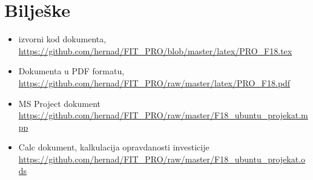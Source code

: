 \documentclass[times, utf8, seminar]{fit}
\begin{document}
\chapter{Bilješke}
\label{chap:biljeske}

\begin{itemize}
  \item izvorni kod dokumenta, \url{https://github.com/hernad/FIT_PRO/blob/master/latex/PRO_F18.tex}
  \item Dokumenta u PDF formatu, \url{https://github.com/hernad/FIT_PRO/raw/master/latex/PRO_F18.pdf}
  \item MS Project dokument \url{https://github.com/hernad/FIT_PRO/raw/master/F18_ubuntu_projekat.mpp}
  \item Calc dokument, kalkulacija opravdanosti investicije \url{https://github.com/hernad/FIT_PRO/raw/master/F18_ubuntu_projekat.ods}
\end{itemize}
\end{document}
